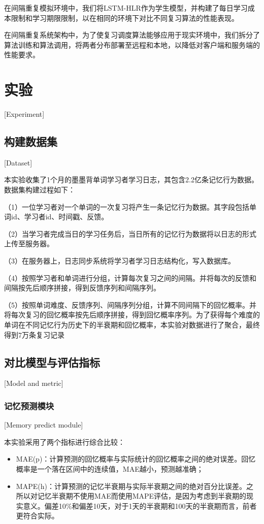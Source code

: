 在间隔重复模拟环境中，我们将LSTM-HLR作为学生模型，并构建了每日学习成本限制和学习期限限制，以在相同的环境下对比不同复习算法的性能表现。

在间隔重复系统架构中，为了使复习调度算法能够应用于现实环境中，我们拆分了算法训练和算法调用，将两者分布部署至远程和本地，以降低对客户端和服务端的性能要求。

\chapter{实验}[Experiment]

\section{构建数据集}[Dataset]

本实验收集了1个月的墨墨背单词学习者学习日志，其包含2.2亿条记忆行为数据。数据集构建过程如下：

（1）一位学习者对一个单词的一次复习将产生一条记忆行为数据。其字段包括单词id、学习者id、时间戳、反馈。

（2）当学习者完成当日的学习任务后，当日所有的记忆行为数据将以日志的形式上传至服务器。

（3）在服务器上，日志同步系统将学习者学习日志结构化，写入数据库。

（4）按照学习者和单词进行分组，计算每次复习之间的间隔。并将每次的反馈和间隔按先后顺序拼接，得到反馈序列和间隔序列。

（5）按照单词难度、反馈序列、间隔序列分组，计算不同间隔下的回忆概率。并将每次复习的回忆概率按先后顺序拼接，得到回忆概率序列。为了获得每个难度的单词在不同记忆行为历史下的半衰期和回忆概率，本实验对数据进行了聚合，最终得到7万条复习记录

\section{对比模型与评估指标}[Model and metric]

\subsection{记忆预测模块}[Memory predict module]

本实验采用了两个指标进行综合比较：

\begin{itemize}
    \item MAE(p)：计算预测的回忆概率与实际统计的回忆概率之间的绝对误差。回忆概率是一个落在区间中的连续值，MAE越小，预测越准确；
    \item MAPE(h)：计算预测的记忆半衰期与实际半衰期之间的绝对百分比误差。之所以对记忆半衰期不使用MAE而使用MAPE评估，是因为考虑到半衰期的现实意义。偏差10\%和偏差10天，对于1天的半衰期和100天的半衰期而言，前者更符合实际。
\end{itemize}

